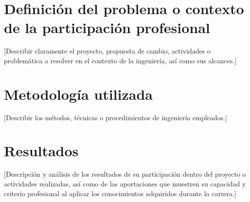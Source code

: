 \documentclass[12pt]{caltech_thesis}
\begin{document}
\chapter{Definición del problema o contexto de la participación profesional}

[Describir claramente el proyecto, propuesta de cambio, actividades o problemática a resolver en el contexto de la ingeniería, así como sus alcances.]




\chapter{Metodología utilizada}

[Describir los métodos, técnicas o procedimientos de ingeniería empleados.]


\chapter{Resultados}

[Descripción y análisis de los resultados de su participación dentro del proyecto o actividades realizadas, así como de las aportaciones que muestren su capacidad y criterio profesional al aplicar los conocimientos adquiridos durante la carrera.]

\end{document}
